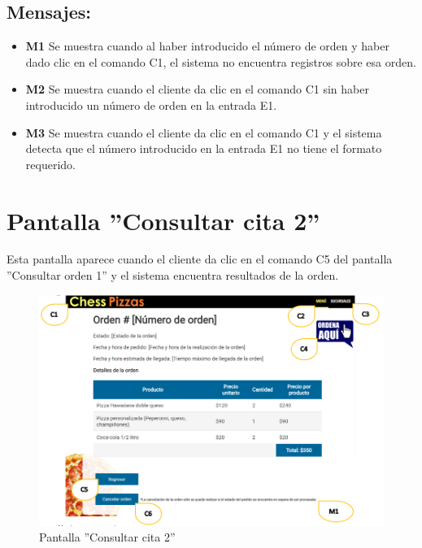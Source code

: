 \documentclass[oneside,10pt]{book}
\begin{document}
\subsection{Mensajes:}
\begin{itemize}
\item \textbf{M1} Se muestra cuando al haber introducido el número de orden y haber dado clic en el comando C1, el sistema no encuentra registros sobre esa orden.
\item \textbf{M2} Se muestra cuando el cliente da clic en el comando C1 sin haber introducido un número de orden en la entrada E1.
\item \textbf{M3} Se muestra cuando el cliente da clic en el comando C1 y el sistema detecta que el número introducido en la entrada E1 no tiene el formato requerido.
\end{itemize}

\section{Pantalla ''Consultar cita 2''}

Esta pantalla aparece cuando el cliente da clic en el comando C5 del  pantalla ''Consultar orden 1'' y el sistema encuentra resultados de la orden.

\begin{figure}[htbp!]
		\centering
			\includegraphics[width=1.1\textwidth]{images/2}
		\caption{Pantalla ''Consultar cita 2''}
	\end{figure}
\end{document}
